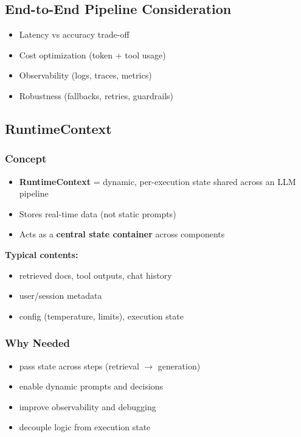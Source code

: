 \documentclass[10pt,a4paper]{article}
\begin{document}
\vspace{0.5em}
\noindent
\subsection{End-to-End Pipeline Consideration}

\begin{itemize}
\item Latency vs accuracy trade-off
\item Cost optimization (token + tool usage)
\item Observability (logs, traces, metrics)
\item Robustness (fallbacks, retries, guardrails)
\end{itemize}

\subsection{RuntimeContext}

\subsubsection{Concept}
\begin{itemize}
\item \textbf{RuntimeContext} = dynamic, per-execution state shared across an LLM pipeline
\item Stores real-time data (not static prompts)
\item Acts as a \textbf{central state container} across components
\end{itemize}

\textbf{Typical contents:}
\begin{itemize}
\item retrieved docs, tool outputs, chat history
\item user/session metadata
\item config (temperature, limits), execution state
\end{itemize}

\vspace{0.3em}
\subsubsection{Why Needed}
\begin{itemize}
\item pass state across steps (retrieval $\rightarrow$ generation)
\item enable dynamic prompts and decisions
\item improve observability and debugging
\item decouple logic from execution state
\end{itemize}
\end{document}
